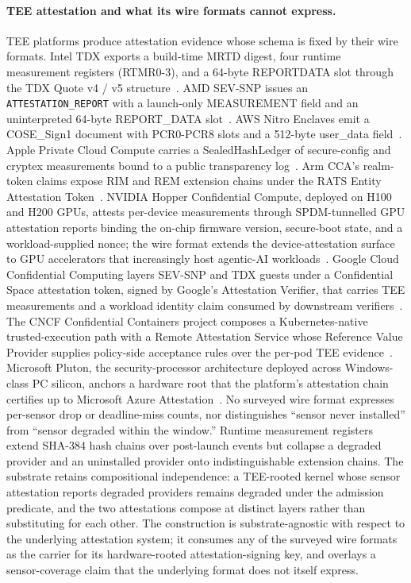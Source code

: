 \paragraph{TEE attestation and what its wire formats cannot express.}
TEE platforms produce attestation evidence whose schema is fixed by their wire formats. Intel TDX exports a build-time MRTD digest, four runtime measurement registers (RTMR0-3), and a 64-byte REPORTDATA slot through the TDX Quote v4 / v5 structure~\cite{intelTDXSpec2023}. AMD SEV-SNP issues an \texttt{ATTESTATION\_REPORT} with a launch-only MEASUREMENT field and an uninterpreted 64-byte REPORT\_DATA slot~\cite{amdSEVSNPSpec2025}. AWS Nitro Enclaves emit a COSE\_Sign1 document with PCR0-PCR8 slots and a 512-byte user\_data field~\cite{awsNitroNSM}. Apple Private Cloud Compute carries a SealedHashLedger of secure-config and cryptex measurements bound to a public transparency log~\cite{applePCC2024}. Arm CCA's realm-token claims expose RIM and REM extension chains under the RATS Entity Attestation Token~\cite{armCCAToken2026}. NVIDIA Hopper Confidential Compute, deployed on H100 and H200 GPUs, attests per-device measurements through SPDM-tunnelled GPU attestation reports binding the on-chip firmware version, secure-boot state, and a workload-supplied nonce; the wire format extends the device-attestation surface to GPU accelerators that increasingly host agentic-AI workloads~\cite{nvidiaHopperCC2024}. Google Cloud Confidential Computing layers SEV-SNP and TDX guests under a Confidential Space attestation token, signed by Google's Attestation Verifier, that carries TEE measurements and a workload identity claim consumed by downstream verifiers~\cite{googleConfidentialComputing2024}. The CNCF Confidential Containers project composes a Kubernetes-native trusted-execution path with a Remote Attestation Service whose Reference Value Provider supplies policy-side acceptance rules over the per-pod TEE evidence~\cite{cncfConfidentialContainers2024}. Microsoft Pluton, the security-processor architecture deployed across Windows-class PC silicon, anchors a hardware root that the platform's attestation chain certifies up to Microsoft Azure Attestation~\cite{microsoftPluton2023,msaa2025}. No surveyed wire format expresses per-sensor drop or deadline-miss counts, nor distinguishes ``sensor never installed'' from ``sensor degraded within the window.'' Runtime measurement registers extend SHA-384 hash chains over post-launch events but collapse a degraded provider and an uninstalled provider onto indistinguishable extension chains. The substrate retains compositional independence: a TEE-rooted kernel whose sensor attestation reports degraded providers remains degraded under the admission predicate, and the two attestations compose at distinct layers rather than substituting for each other. The construction is substrate-agnostic with respect to the underlying attestation system; it consumes any of the surveyed wire formats as the carrier for its hardware-rooted attestation-signing key, and overlays a sensor-coverage claim that the underlying format does not itself express.

